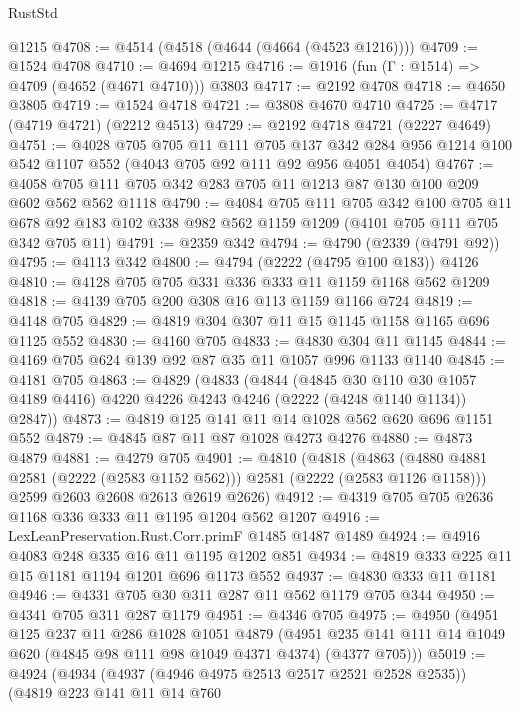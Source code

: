 \begin{lexlean}{RustStd}
\begin{coremodule}
    @1215
@4708 := @4514 (@4518 (@4644 (@4664 (@4523 @1216))))
@4709 := @1524 @4708
@4710 := @4694 @1215
@4716 := @1916 (fun (Γ : @1514) => @4709 (@4652 (@4671 @4710))) @3803
@4717 := @2192 @4708
@4718 := @4650 @3805
@4719 := @1524 @4718
@4721 := @3808 @4670 @4710
@4725 := @4717 (@4719 @4721) (@2212 @4513)
@4729 := @2192 @4718 @4721 (@2227 @4649)
@4751 := @4028
    @705
    @705
    @11
    @111
    @705
    @137
    @342
    @284
    @956
    @1214
    @100
    @542
    @1107
    @552
    (@4043 @705 @92 @111 @92 @956 @4051 @4054)
@4767 := @4058 @705 @111 @705 @342 @283 @705 @11 @1213 @87 @130 @100 @209 @602 @562 @562 @1118
@4790 := @4084
    @705
    @111
    @705
    @342
    @100
    @705
    @11
    @678
    @92
    @183
    @102
    @338
    @982
    @562
    @1159
    @1209
    (@4101 @705 @111 @705 @342 @705 @11)
@4791 := @2359 @342
@4794 := @4790 (@2339 (@4791 @92))
@4795 := @4113 @342
@4800 := @4794 (@2222 (@4795 @100 @183)) @4126
@4810 := @4128 @705 @705 @331 @336 @333 @11 @1159 @1168 @562 @1209
@4818 := @4139 @705 @200 @308 @16 @113 @1159 @1166 @724
@4819 := @4148 @705
@4829 := @4819 @304 @307 @11 @15 @1145 @1158 @1165 @696 @1125 @552
@4830 := @4160 @705
@4833 := @4830 @304 @11 @1145
@4844 := @4169 @705 @624 @139 @92 @87 @35 @11 @1057 @996 @1133 @1140
@4845 := @4181 @705
@4863 := @4829
    (@4833
      (@4844
        (@4845 @30 @110 @30 @1057 @4189 @4416)
        @4220
        @4226
        @4243
        @4246
        (@2222 (@4248 @1140 @1134))
        @2847))
@4873 := @4819 @125 @141 @11 @14 @1028 @562 @620 @696 @1151 @552
@4879 := @4845 @87 @11 @87 @1028 @4273 @4276
@4880 := @4873 @4879
@4881 := @4279 @705
@4901 := @4810
    (@4818
      (@4863 (@4880 @4881 @2581 (@2222 (@2583 @1152 @562))) @2581 (@2222 (@2583 @1126 @1158)))
      @2599
      @2603
      @2608
      @2613
      @2619
      @2626)
@4912 := @4319 @705 @705 @2636 @1168 @336 @333 @11 @1195 @1204 @562 @1207
@4916 := LexLeanPreservation.Rust.Corr.primF @1485 @1487 @1489
@4924 := @4916 @4083 @248 @335 @16 @11 @1195 @1202 @851
@4934 := @4819 @333 @225 @11 @15 @1181 @1194 @1201 @696 @1173 @552
@4937 := @4830 @333 @11 @1181
@4946 := @4331 @705 @30 @311 @287 @11 @562 @1179 @705 @344
@4950 := @4341 @705 @311 @287 @1179
@4951 := @4346 @705
@4975 := @4950
    (@4951
      @125
      @237
      @11
      @286
      @1028
      @1051
      @4879
      (@4951 @235 @141 @111 @14 @1049 @620 (@4845 @98 @111 @98 @1049 @4371 @4374) (@4377 @705)))
@5019 := @4924
    (@4934
      (@4937 (@4946 @4975 @2513 @2517 @2521 @2528 @2535))
      (@4819
        @223
        @141
        @11
        @14
        @760

\end{coremodule}
\end{lexlean}
